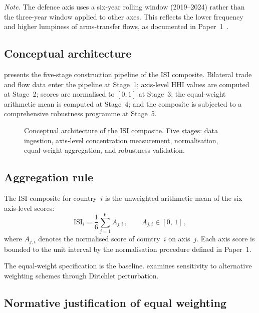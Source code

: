 \noindent\textit{Note.}  The defence axis uses a six-year rolling
window (2019--2024) rather than the three-year window applied to other
axes.  This reflects the lower frequency and higher lumpiness of
arms-transfer flows, as documented in Paper~1~\cite{isi_paper1}.

\subsection{Conceptual architecture}

 presents the five-stage construction pipeline
of the ISI composite.  Bilateral trade and flow data enter the
pipeline at Stage~1; axis-level HHI values are computed at Stage~2;
scores are normalised to $[0,1]$ at Stage~3; the equal-weight
arithmetic mean is computed at Stage~4; and the composite is
subjected to a comprehensive robustness programme at Stage~5.

\begin{figure}[htbp]
\centering
\resizebox{\textwidth}{!}{%
%
}
\caption{Conceptual architecture of the ISI composite.
  Five stages: data ingestion, axis-level concentration measurement,
  normalisation, equal-weight aggregation, and robustness validation.}
\label{fig:architecture}
\end{figure}

\subsection{Aggregation rule}

The ISI composite for country~$i$ is the unweighted arithmetic mean
of the six axis-level scores:
\begin{equation}\label{eq:composite}
  \text{ISI}_i
  = \frac{1}{6}\sum_{j=1}^{6} A_{j,i}
  \,,\qquad
  A_{j,i} \in [0,\,1]
  \,,
\end{equation}
where $A_{j,i}$ denotes the normalised score of country~$i$ on axis~$j$.
Each axis score is bounded to the unit interval by the normalisation
procedure defined in Paper~1.

The equal-weight specification is the baseline.  
examines sensitivity to alternative weighting schemes through Dirichlet
perturbation.

\subsection{Normative justification of equal weighting}\label{sec:equal-weight-defence}

